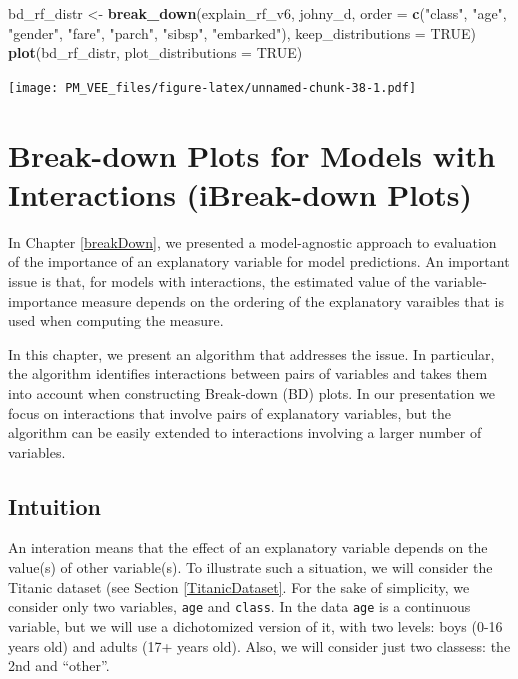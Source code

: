 \documentclass[12pt,]{krantz}
\newenvironment{Shaded}{\begin{snugshade}}{\end{snugshade}}
\newcommand{\DataTypeTok}[1]{\textcolor[rgb]{0.13,0.29,0.53}{#1}}
\newcommand{\KeywordTok}[1]{\textcolor[rgb]{0.13,0.29,0.53}{\textbf{#1}}}
\newcommand{\NormalTok}[1]{#1}
\newcommand{\OtherTok}[1]{\textcolor[rgb]{0.56,0.35,0.01}{#1}}
\newcommand{\StringTok}[1]{\textcolor[rgb]{0.31,0.60,0.02}{#1}}
\begin{document}
\begin{Shaded}
\begin{Highlighting}[]
\NormalTok{bd_rf_distr <-}\StringTok{ }\KeywordTok{break_down}\NormalTok{(explain_rf_v6,}
\NormalTok{                 johny_d,}
                 \DataTypeTok{order =} \KeywordTok{c}\NormalTok{(}\StringTok{"class"}\NormalTok{, }\StringTok{"age"}\NormalTok{, }\StringTok{"gender"}\NormalTok{, }\StringTok{"fare"}\NormalTok{, }\StringTok{"parch"}\NormalTok{, }\StringTok{"sibsp"}\NormalTok{, }\StringTok{"embarked"}\NormalTok{),}
                 \DataTypeTok{keep_distributions =} \OtherTok{TRUE}\NormalTok{)}
\KeywordTok{plot}\NormalTok{(bd_rf_distr, }\DataTypeTok{plot_distributions =} \OtherTok{TRUE}\NormalTok{) }
\end{Highlighting}
\end{Shaded}

\texttt{[image: PM\_VEE\_files/figure-latex/unnamed-chunk-38-1.pdf]}

\hypertarget{iBreakDown}{%
\section{Break-down Plots for Models with Interactions (iBreak-down Plots)}\label{iBreakDown}}

In Chapter \ref{breakDown}, we presented a model-agnostic approach to evaluation of the importance of an explanatory variable for model predictions. An important issue is that, for models with interactions, the estimated value of the variable-importance measure depends on the ordering of the explanatory varaibles that is used when computing the measure.

In this chapter, we present an algorithm that addresses the issue. In particular, the algorithm identifies interactions between pairs of variables and takes them into account when constructing Break-down (BD) plots. In our presentation we focus on interactions that involve pairs of explanatory variables, but the algorithm can be easily extended to interactions involving a larger number of variables.

\hypertarget{iBDIntuition}{%
\subsection{Intuition}\label{iBDIntuition}}

An interation means that the effect of an explanatory variable depends on the value(s) of other variable(s). To illustrate such a situation, we will consider the Titanic dataset (see Section \ref{TitanicDataset}. For the sake of simplicity, we consider only two variables, \texttt{age} and \texttt{class}. In the data \texttt{age} is a continuous variable, but we will use a dichotomized version of it, with two levels: boys (0-16 years old) and adults (17+ years old). Also, we will consider just two classess: the 2nd and ``other''.
\end{document}
